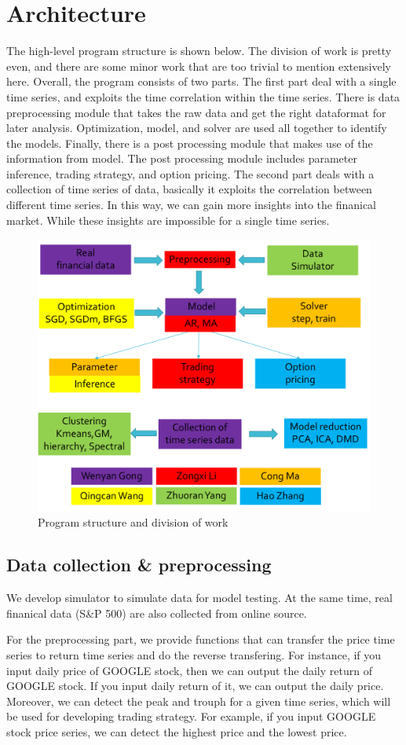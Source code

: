 \documentclass[12pt,a4paper]{article}
\begin{document}
\section{Architecture}
The high-level program structure is shown below. The division of work is pretty even, and there are some minor work that are too trivial to mention extensively here. Overall, the program consists of two parts. The first part deal with a single time series, and exploits the time correlation within the time series. There is data preprocessing module that takes the raw data and get the right dataformat for later analysis. Optimization, model, and solver are used all together to identify the models. Finally, there is a post processing module that makes use of the information from model. The post processing module includes parameter inference, trading strategy, and option pricing. The second part deals with a collection of time series of data, basically it exploits the correlation between different time series. In this way, we can gain more insights into the finanical market. While these insights are impossible for a single time series.
\begin{figure}[H]
        \centering
     \includegraphics[width=.5\linewidth]{./Figure/structure.png}
\caption{Program structure and division of work}
\end{figure}

\subsection{Data collection \& preprocessing}
We develop simulator to simulate data for model testing. At the same time, real finanical data (S\&P 500) are also collected from online source.

For the preprocessing part, we provide functions that can transfer the price time series to return time series and do the reverse transfering. For instance, if you input daily price of GOOGLE stock, then we can output the daily return of GOOGLE stock. If you input daily return of it, we can output the daily price. Moreover, we can detect the peak and trouph for a given time series, which will be used for developing trading strategy. For example, if you input GOOGLE stock price series, we can detect the highest price and the lowest price.
\end{document}
